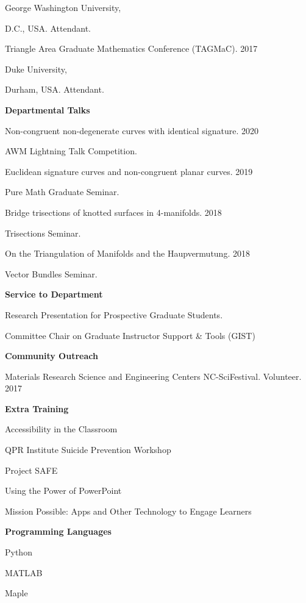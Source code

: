 \documentclass{article}
\begin{document}
George Washington University,

D.C., USA.  Attendant.

\medskip
Triangle Area Graduate Mathematics Conference (TAGMaC). \hfill 2017

Duke University,

Durham, USA. Attendant.
\bigskip
\bigskip

\textsf{\textbf{\Large Departmental Talks}\hrulefill}

\medskip
Non-congruent non-degenerate curves with identical signature. \hfill 2020

AWM Lightning Talk Competition. 

\medskip
Euclidean signature curves and non-congruent planar curves. \hfill 2019

Pure Math Graduate Seminar. 

\medskip
Bridge trisections of knotted surfaces in 4-manifolds. \hfill 2018

Trisections Seminar. 

\medskip
On the Triangulation of Manifolds and the Haupvermutung. \hfill 2018

Vector Bundles Seminar. 

%
%
\bigskip
\bigskip

\textsf{\textbf{\Large Service to Department} \hrulefill}

\medskip
Research Presentation for Prospective Graduate Students.

\medskip
Committee Chair on Graduate Instructor Support \& Tools (GIST)

\bigskip
\bigskip

\textsf{\textbf{\Large Community Outreach} \hrulefill}

\medskip
Materials Research Science and Engineering Centers NC-SciFestival. Volunteer. \hfill 2017 

\bigskip
\bigskip

\textsf{\textbf{\Large Extra Training}\hrulefill}

\medskip
Accessibility in the Classroom

\medskip
QPR Institute Suicide Prevention Workshop

\medskip
Project SAFE

\medskip
Using the Power of PowerPoint

\medskip
Mission Possible: Apps and Other Technology to Engage Learners

\medskip
\medskip

\textsf{\textbf{Programming Languages}}

\medskip

Python

MATLAB

Maple


%
%
\end{document}
